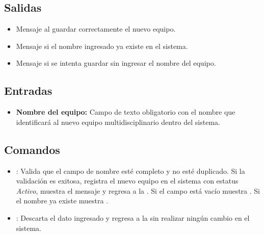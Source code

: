 
\subsection{Salidas}
\begin{itemize}
	\item Mensaje  
	al guardar correctamente el nuevo equipo.
	\item Mensaje  
	si el nombre ingresado ya existe en el sistema.
	\item Mensaje  
	si se intenta guardar sin ingresar el nombre del equipo.
\end{itemize}

\subsection{Entradas}
\begin{itemize}
	\item \textbf{Nombre del equipo:} Campo de texto obligatorio 
	con el nombre que identificará al nuevo equipo 
	multidisciplinario dentro del sistema.
\end{itemize}

\subsection{Comandos}
\begin{itemize}
	\item {}: Valida que el campo de nombre esté 
	completo y no esté duplicado. Si la validación es exitosa, 
	registra el nuevo equipo en el sistema con estatus 
	\textit{Activo}, muestra el mensaje 
	 y regresa a 
	la . Si el campo está vacío muestra 
	. Si el nombre 
	ya existe muestra 
	.
	
	\item {}: Descarta el dato ingresado y 
	regresa a la  sin realizar ningún cambio en el sistema.
\end{itemize}


